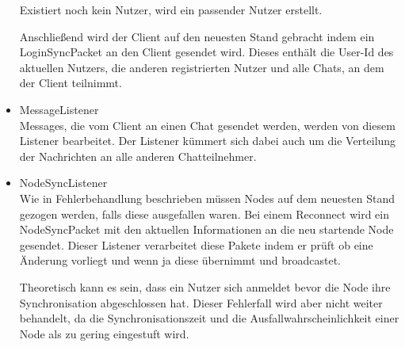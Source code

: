 \begin{itemize}
        
        Existiert noch kein Nutzer, wird ein passender Nutzer erstellt.
        
        Anschließend wird der Client auf den neuesten Stand gebracht indem ein LoginSyncPacket an den Client gesendet wird. Dieses enthält die User-Id des aktuellen Nutzers, die anderen registrierten Nutzer und alle Chats, an dem der Client teilnimmt.
        
    \item MessageListener\\
        Messages, die vom Client an einen Chat gesendet werden, werden von diesem Listener bearbeitet. Der Listener kümmert sich dabei auch um die Verteilung der Nachrichten an alle anderen Chatteilnehmer.
        
    \item NodeSyncListener\\
        Wie in Fehlerbehandlung beschrieben müssen Nodes auf dem neuesten Stand gezogen werden, falls diese ausgefallen waren. Bei einem Reconnect wird ein NodeSyncPacket mit den aktuellen Informationen an die neu startende Node gesendet. Dieser Listener verarbeitet diese Pakete indem er prüft ob eine Änderung vorliegt und wenn ja diese übernimmt und broadcastet. 
        
        Theoretisch kann es sein, dass ein Nutzer sich anmeldet bevor die Node ihre Synchronisation abgeschlossen hat. Dieser Fehlerfall wird aber nicht weiter behandelt, da die Synchronisationszeit und die Ausfallwahrscheinlichkeit einer Node als zu gering eingestuft wird.
\end{itemize}

